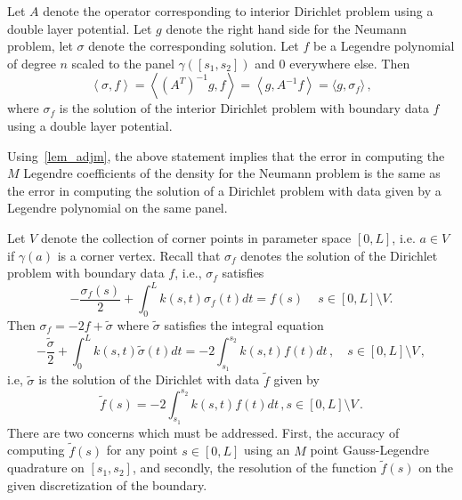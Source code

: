 \documentclass[12pt]{article}
\begin{document}
Let $A$ denote the operator corresponding to interior Dirichlet problem using a double layer potential. Let $g$ denote the
right hand side for the Neumann problem, let $\sigma$ denote the corresponding solution. Let $f$ be a Legendre polynomial of
degree $n$ scaled to the panel $\gamma([s_{1},s_{2}])$ and $0$ everywhere else. Then
\begin{equation}
\left<\sigma, f \right> = \left< (A^{T})^{-1} g, f\right> = \left< g, A^{-1} f \right> = \langle g, \sigma_{f}\rangle \, ,
\end{equation}
where $\sigma_{f}$ is the solution of the interior Dirichlet problem with boundary data $f$ using a double layer potential.
 

Using~\cref{lem_adjm}, the above statement implies that the error in computing the $M$ Legendre coefficients of
the density for the Neumann problem is the same as the error in computing the solution of a Dirichlet problem with 
data given by a Legendre polynomial on the same panel. 

Let $V$ denote the collection of corner points in parameter space $[0,L]$, i.e. $a \in V$ if $\gamma(a)$ is a corner vertex.
Recall that $\sigma_{f}$ denotes the solution of the Dirichlet problem with boundary data $f$, i.e., 
$\sigma_{f}$ satisfies
\begin{equation}
-\frac{\sigma_{f}(s)}{2}   + \int_{0}^{L} k(s,t) \sigma_{f}(t) dt  = f(s) \,  \quad s\in[0,L]\setminus{V}.
\end{equation}
 Then $\sigma_{f} = -2f + \tilde{\sigma}$ where $\tilde{\sigma}$ satisfies the integral equation
 \begin{equation}
-\frac{\tilde{\sigma}}{2}+ \int_{0}^{L} k(s,t) \tilde{\sigma}(t) dt = -2\int_{s_{1}}^{s_{2}} k(s,t) f(t) dt \, , \quad s\in[0,L] \setminus V \, ,
 \end{equation}
i.e, $\tilde{\sigma}$ is the solution of the Dirichlet with data $\tilde{f}$ given by
\begin{equation}
\tilde{f}(s) = -2\int_{s_{1}}^{s_{2}} k(s,t) f(t) dt \, , s \in [0,L] \setminus V \, .
\end{equation}
There are two concerns which must be addressed. First, the accuracy of computing $\tilde{f}(s)$ 
for any point $s \in [0,L]$ using an $M$ point Gauss-Legendre quadrature on $[s_{1},s_{2}]$, and secondly, 
the resolution of the function $\tilde{f}(s)$ on the given discretization of the boundary. 
\end{document}
